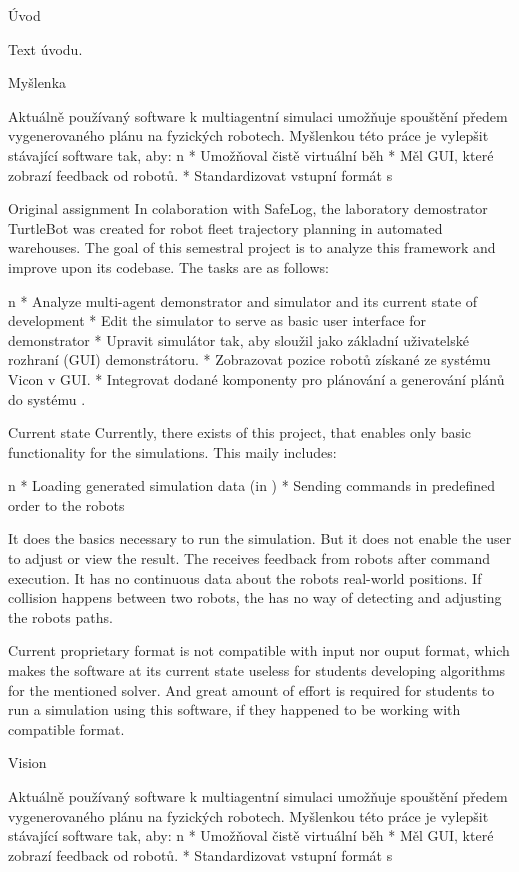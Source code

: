\chap Úvod


Text úvodu.

\sec Myšlenka

Aktuálně používaný software k multiagentní simulaci umožňuje spouštění předem vygenerovaného plánu na fyzických robotech. Myšlenkou této práce je vylepšit stávající software tak, aby:
\begitems \style n
    * Umožňoval čistě virtuální běh
    * Měl GUI, které zobrazí feedback od robotů.
    * Standardizovat vstupní formát s \mapfIR
\enditems

\sec Original assignment
In colaboration with SafeLog, the laboratory demostrator TurtleBot was created for robot fleet trajectory planning in automated warehouses. The goal of this semestral project is to analyze this framework and improve upon its codebase. The tasks are as follows:

\begitems \style n
    * Analyze multi-agent demonstrator and simulator {\mapfIR} and its current state of development 
    * Edit the simulator to serve as basic user interface for demonstrator
    * Upravit simulátor tak, aby sloužil jako základní uživatelské rozhraní (GUI) demonstrátoru.
    * Zobrazovat pozice robotů získané ze systému Vicon v GUI.
    * Integrovat dodané komponenty pro plánování a generování plánů do systému .
\enditems

\sec Current state
Currently, there exists {\oldRepo} of this project, that enables only basic functionality for the simulations. This maily includes:

\begitems \style n
    * Loading generated simulation data (in {\oldFormat})
    * Sending commands in predefined order to the robots
\enditems

It does the basics necessary to run the simulation. But it does not enable the user to adjust or view the result. The {\oldRepo} receives feedback from robots after command execution. It has no continuous data about the robots real-world positions. If collision happens between two robots, the {\oldRepo} has no way of detecting and adjusting the robots paths.

Current proprietary format is not compatible with {\mapfIR} input nor ouput format, which makes the software at its current state useless for students developing algorithms for the mentioned solver. And great amount of effort is required for students to run a simulation using this software, if they happened to be working with compatible format.

\sec Vision



Aktuálně používaný software k multiagentní simulaci umožňuje spouštění předem vygenerovaného plánu na fyzických robotech. Myšlenkou této práce je vylepšit stávající software tak, aby:
\begitems \style n
    * Umožňoval čistě virtuální běh
    * Měl GUI, které zobrazí feedback od robotů.
    * Standardizovat vstupní formát s \mapfIR
\enditems




\bye
\endtt
